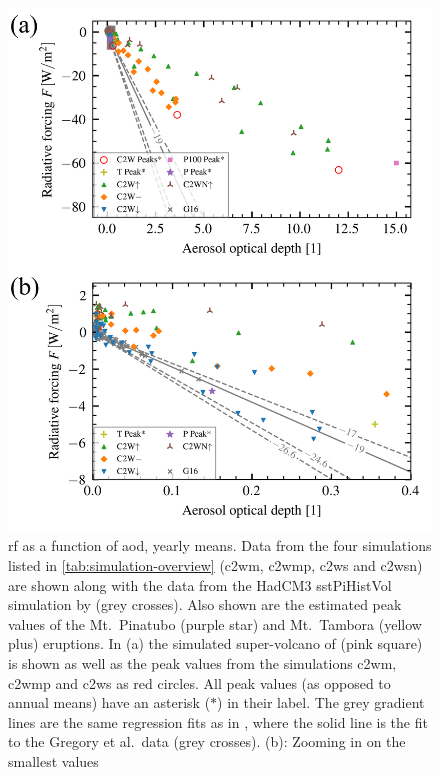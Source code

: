 \documentclass{ametsocV6.1}
\begin{document}
\begin{figure}
  \centering
  \includegraphics[width=0.95\linewidth]{figures/aod_vs_toa_avg.png}

  \caption{\gls{rf} as a function of \gls{aod}, yearly means. Data from the four
    simulations listed in \ref{tab:simulation-overview} (\gls{c2wm}, \gls{c2wmp}, \gls{c2ws}
    and \gls{c2wsn}) are shown along with the data from the HadCM3 sstPiHistVol simulation
    by \citet{gregory2016} (grey crosses). Also shown are the estimated peak values of the
    Mt.\ Pinatubo (purple star) and Mt.\ Tambora (yellow plus) eruptions. In (a) the
    simulated super-volcano of \citet{jones2005} (pink square) is shown as well as the peak
    values from the simulations \gls{c2wm}, \gls{c2wmp} and \gls{c2ws} as red circles. All
    peak values (as opposed to annual means) have an asterisk (\(\ast{}\)) in their label.
    The grey gradient lines are the same regression fits as in \citet[][Fig.\
      4]{gregory2016}, where the solid line is the fit to the Gregory et al.\ data (grey
    crosses). (b): Zooming in on the smallest values}\label{fig:aod_vs_toa_ses_avg}%
\end{figure}
\end{document}
